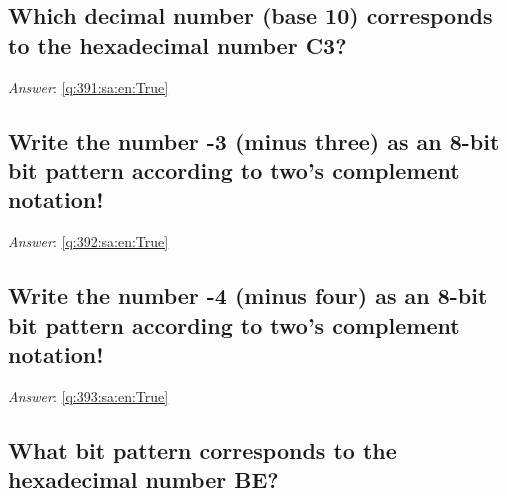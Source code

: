 \documentclass[a4paper,11pt,oneside]{article}
\begin{document}
\begin{sloppypar}
\subsection{Which decimal number (base 10) corresponds to the hexadecimal number C3?}

\label{q:391:sa:en:False}

\vspace{2cm}

\noindent\makebox[\textwidth]{\hrulefill}

\vspace{1cm}

\textit{Answer}: \autoref{q:391:sa:en:True}



\subsection{Write the number -3 (minus three) as an 8-bit bit pattern according to two's complement notation!}

\label{q:392:sa:en:False}

\vspace{2cm}

\noindent\makebox[\textwidth]{\hrulefill}

\vspace{1cm}

\textit{Answer}: \autoref{q:392:sa:en:True}



\subsection{Write the number -4 (minus four) as an 8-bit bit pattern according to two's complement notation!}

\label{q:393:sa:en:False}

\vspace{2cm}

\noindent\makebox[\textwidth]{\hrulefill}

\vspace{1cm}

\textit{Answer}: \autoref{q:393:sa:en:True}



\subsection{What bit pattern corresponds to the hexadecimal number BE?}

\label{q:394:sa:en:False}


\end{sloppypar}
\end{document}
